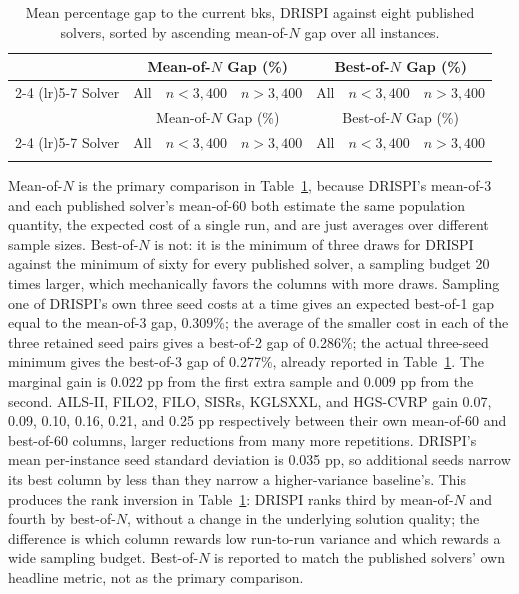 \begin{longtable}{@{}lrrrrrr@{}}
\caption{Mean percentage gap to the current \gls{bks}, DRISPI against eight published solvers, sorted by ascending mean-of-$N$ gap over all instances.}\label{tab:solver-summary}\\
\toprule
& \multicolumn{3}{c}{Mean-of-$N$ Gap (\%)} & \multicolumn{3}{c}{Best-of-$N$ Gap (\%)} \\
\cmidrule(lr){2-4} \cmidrule(lr){5-7}
Solver & All & $n<3{,}400$ & $n>3{,}400$ & All & $n<3{,}400$ & $n>3{,}400$ \\
\midrule
\endfirsthead
\toprule
& \multicolumn{3}{c}{Mean-of-$N$ Gap (\%)} & \multicolumn{3}{c}{Best-of-$N$ Gap (\%)} \\
\cmidrule(lr){2-4} \cmidrule(lr){5-7}
Solver & All & $n<3{,}400$ & $n>3{,}400$ & All & $n<3{,}400$ & $n>3{,}400$ \\
\midrule
\endhead
\bottomrule
\endfoot
\bottomrule
\endlastfoot

\end{longtable}

Mean-of-$N$ is the primary comparison in Table~\ref{tab:solver-summary}, because DRISPI's mean-of-3 and each published solver's mean-of-60 both estimate the same population quantity, the expected cost of a single run, and are just averages over different sample sizes. Best-of-$N$ is not: it is the minimum of three draws for DRISPI against the minimum of sixty for every published solver, a sampling budget 20 times larger, which mechanically favors the columns with more draws. Sampling one of DRISPI's own three seed costs at a time gives an expected best-of-1 gap equal to the mean-of-3 gap, 0.309\%; the average of the smaller cost in each of the three retained seed pairs gives a best-of-2 gap of 0.286\%; the actual three-seed minimum gives the best-of-3 gap of 0.277\%, already reported in Table~\ref{tab:solver-summary}. The marginal gain is 0.022 pp from the first extra sample and 0.009 pp from the second. AILS-II, FILO2, FILO, SISRs, KGLSXXL, and HGS-CVRP gain 0.07, 0.09, 0.10, 0.16, 0.21, and 0.25 pp respectively between their own mean-of-60 and best-of-60 columns, larger reductions from many more repetitions. DRISPI's mean per-instance seed standard deviation is 0.035 pp, so additional seeds narrow its best column by less than they narrow a higher-variance baseline's. This produces the rank inversion in Table~\ref{tab:solver-summary}: DRISPI ranks third by mean-of-$N$ and fourth by best-of-$N$, without a change in the underlying solution quality; the difference is which column rewards low run-to-run variance and which rewards a wide sampling budget. Best-of-$N$ is reported to match the published solvers' own headline metric, not as the primary comparison.

